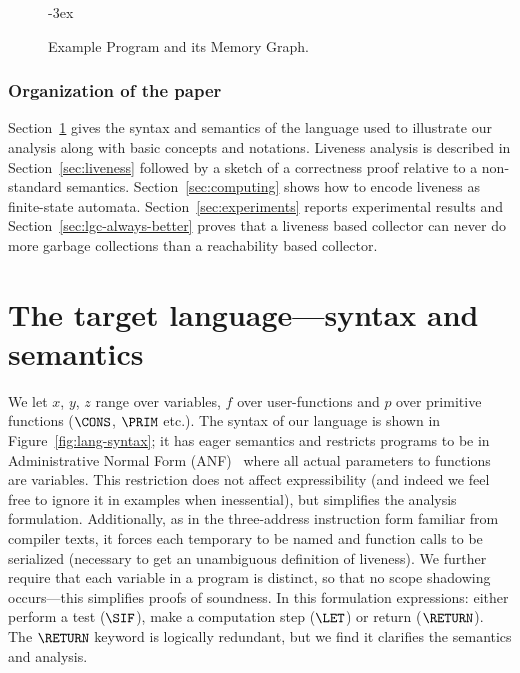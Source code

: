 \documentclass{llncs}
\begin{document}
\begin{figure}[t!]
\kern -3ex

\caption{Example Program and its Memory Graph.}\label{fig:mot-example}    
\end{figure}


\subsubsection{Organization of the paper}
Section~\ref{sec:defs} gives
the syntax and semantics of
the language used to illustrate our analysis along with basic concepts
and    notations.
Liveness analysis is described in
Section~\ref{sec:liveness} followed by a sketch of a correctness
proof relative to a non-standard semantics.
Section~\ref{sec:computing} shows how to encode liveness as
finite-state automata.
Section~\ref{sec:experiments}   reports   experimental   results and
Section~\ref{sec:lgc-always-better} proves that a liveness based
collector can never do more garbage collections than a reachability
based collector. 

\section{The target language---syntax and semantics}
\label{sec:defs}
We let $x$, $y$, $z$ range over variables, $f$ over user-functions and $p$ over primitive
functions ($\CONS$, $\PRIM$ etc.).
The syntax  of our language is  shown in Figure~\ref{fig:lang-syntax};
it has eager semantics and restricts programs to be in 
Administrative  Normal Form (ANF)~\cite{chakravarty03perspective}
where all actual parameters to functions are variables.
This restriction does not affect expressibility (and indeed we feel free
to ignore it in examples when inessential), but simplifies the analysis formulation.
Additionally, as in the three-address instruction form familiar from compiler texts,
it forces each temporary to be named and function calls to be serialized
(necessary to get an unambiguous definition of liveness).
We further require that each variable in a program is distinct, so that no scope shadowing
occurs---this simplifies proofs of soundness.
In this formulation expressions: either perform a test ($\SIF$), make a computation step ($\LET$)
or return ($\RETURN$).
The $\RETURN$ keyword is logically redundant, but we find it clarifies the semantics and analysis.
\end{document}
